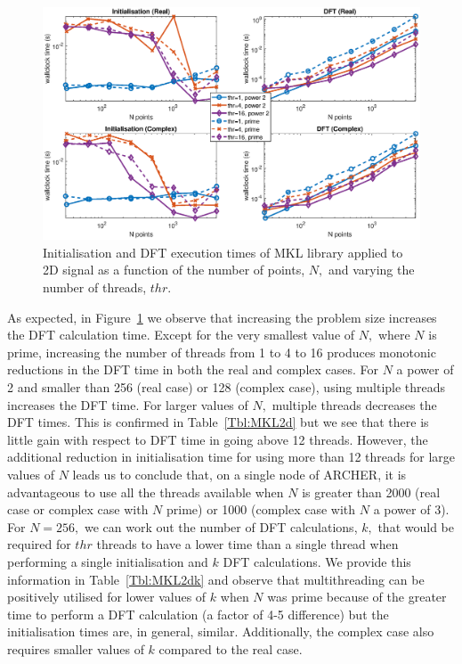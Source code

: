 \documentclass[a4paper]{article}
\begin{document}
\begin{figure}[htb]
    \centering
    \includegraphics[width=0.9\linewidth]{../results/mkl_2d_thr.eps}
  \caption{Initialisation and DFT execution times of MKL library applied to 2D signal as a function of the
    number of points, $N,$ and varying the number of threads, $thr.$ }
  \label{2DMKL}
\end{figure}




As expected, in Figure~\ref{2DMKL} we observe that increasing the
problem size increases the DFT calculation time. Except for the very
smallest value of $N,$ where $N$ is prime, increasing the number of
threads from 1 to 4 to 16 produces monotonic reductions in the DFT
time in both the real and complex cases. For $N$ a power of 2 and
smaller than 256 (real case) or 128 (complex case), using multiple
threads increases the DFT time. For larger values of $N,$ multiple
threads decreases the DFT times. This is confirmed in
Table~\ref{Tbl:MKL2d} but we see that there is little gain with
respect to DFT time in going above 12 threads. However, the additional
reduction in initialisation time for using more than 12 threads for
large values of $N$ leads us to conclude that, on a single node of
ARCHER, it is advantageous to use all the threads available when $N$
is greater than 2000 (real case or complex case with $N$ prime) or
1000 (complex case with $N$ a power of 3). For $N=256,$ we can work
out the number of DFT calculations, $k,$ that would be required for
$thr$ threads to have a lower time than a single thread when
performing a single initialisation and $k$ DFT calculations. We
provide this information in Table~\ref{Tbl:MKL2dk} and observe that
multithreading can be positively utilised for lower values of $k$ when
$N$ was prime because of the greater time to perform a DFT calculation
(a factor of 4-5 difference) but the initialisation times are, in
general, similar. Additionally, the complex case also requires smaller
values of $k$ compared to the real case.
\end{document}

